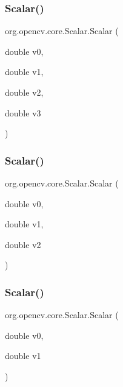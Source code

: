 \subsubsection{\texorpdfstring{Scalar()}{Scalar()}\hspace{0.1cm}{\footnotesize\ttfamily [1/5]}}
{\footnotesize\ttfamily org.\+opencv.\+core.\+Scalar.\+Scalar (\begin{DoxyParamCaption}\item[{double}]{v0,  }\item[{double}]{v1,  }\item[{double}]{v2,  }\item[{double}]{v3 }\end{DoxyParamCaption})}

\mbox{\label{classorg_1_1opencv_1_1core_1_1_scalar_ac7e4a16663084e22ce81338ed51b901d}} 
\subsubsection{\texorpdfstring{Scalar()}{Scalar()}\hspace{0.1cm}{\footnotesize\ttfamily [2/5]}}
{\footnotesize\ttfamily org.\+opencv.\+core.\+Scalar.\+Scalar (\begin{DoxyParamCaption}\item[{double}]{v0,  }\item[{double}]{v1,  }\item[{double}]{v2 }\end{DoxyParamCaption})}

\mbox{\label{classorg_1_1opencv_1_1core_1_1_scalar_af0dc66669d16d1a30ed0b44981a25b69}} 
\subsubsection{\texorpdfstring{Scalar()}{Scalar()}\hspace{0.1cm}{\footnotesize\ttfamily [3/5]}}
{\footnotesize\ttfamily org.\+opencv.\+core.\+Scalar.\+Scalar (\begin{DoxyParamCaption}\item[{double}]{v0,  }\item[{double}]{v1 }\end{DoxyParamCaption})}


